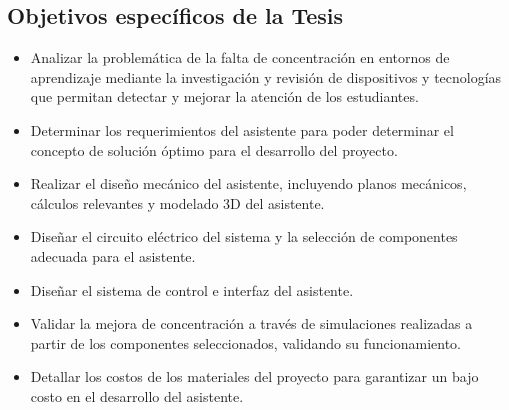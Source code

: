             \subsection{Objetivos específicos de la Tesis}
        \begin{itemize}
            \item Analizar la problemática de la falta  de concentración en entornos de aprendizaje mediante la investigación y revisión de dispositivos y tecnologías que permitan detectar y mejorar la atención de los estudiantes.
            \item Determinar los requerimientos del asistente para poder determinar el concepto de solución óptimo para el desarrollo del proyecto.
           \item Realizar el diseño mecánico del asistente, incluyendo planos mecánicos, cálculos relevantes y modelado 3D del asistente.
            \item Diseñar el circuito eléctrico del sistema y la selección de componentes adecuada para el asistente.
            \item Diseñar el sistema de control e interfaz del asistente.
            
            \item Validar la mejora de concentración a través de simulaciones realizadas a partir de los componentes seleccionados, validando su funcionamiento.
            \item Detallar los costos de los materiales del proyecto para garantizar un bajo costo en el desarrollo del asistente.
            \end{itemize}
              
